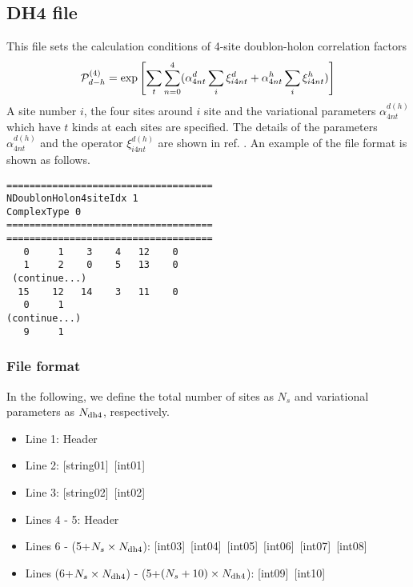\newpage
\subsection{DH4 file}
\label{Subsec:DH4}
This file sets the calculation conditions of 4-site doublon-holon correlation factors 
\begin{equation}
{\cal P}_{d-h}^{(4)}= \exp \left[ \sum_t \sum_{n=0}^4 (\alpha_{4nt}^d \sum_{i}\xi_{i4nt}^d+\alpha_{4nt}^h \sum_{i}\xi_{i4nt}^h)\right]
\end{equation}
A site number $i$, the four sites around $i$ site and the variational parameters $\alpha_{4nt}^{d(h)}$ which have $t$ kinds at each sites are specified.
The details of the parameters $\alpha_{4nt}^{d(h)}$ and the operator $\xi_{i4nt}^{d(h)}$ are shown in ref. \cite{Tahara2008}.
An example of the file format is shown as follows.

\begin{minipage}{12.5cm}
\begin{screen}
\begin{verbatim}
====================================
NDoublonHolon4siteIdx 1  
ComplexType 0
====================================
====================================
   0     1    3    4   12    0
   1     2    0    5   13    0
 (continue...)
  15    12   14    3   11    0
   0     1 
(continue...)
   9     1 
\end{verbatim}
\end{screen}
\end{minipage}

\subsubsection{File format}
In the following, we define the total number of sites as $N_s$ and variational parameters as $N_{\rm dh4}$, respectively.  
 \begin{itemize}
   \item  Line 1: Header
   \item  Line 2: [string01]~[int01]
   \item  Line 3: [string02]~[int02]
   \item  Lines 4 - 5:  Header
   \item  Lines 6 - (5+$N_s\times N_{\rm dh4}$): [int03]~[int04]~[int05]~[int06]~[int07]~[int08]
   \item  Lines (6+$N_s\times N_{\rm dh4}$) - (5+$(N_s+10) \times N_{\rm dh4}$): [int09]~[int10]
  \end{itemize}
